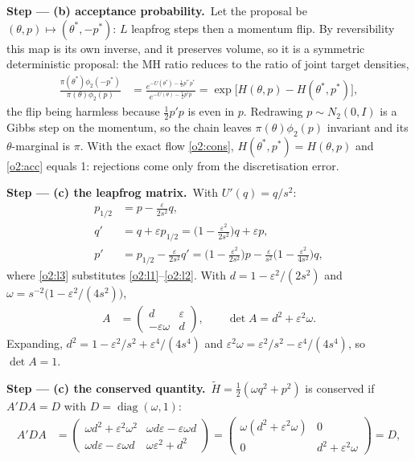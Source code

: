 \documentclass[11pt,a4paper]{article}
\newcommand{\passo}[2]{\par\smallskip\noindent\textbf{Step --- #1.}~#2}
\begin{document}
\begin{sol}
\passo{(b) acceptance probability}{Let the proposal be $(\theta,p)\mapsto(\theta^*,-p^*)$: $L$ leapfrog steps then a momentum flip. By reversibility this map is its own inverse, and it preserves volume, so it is a symmetric deterministic proposal: the MH ratio reduces to the ratio of joint target densities,
\begin{align}
\frac{\pi(\theta^*)\phi_2(-p^*)}{\pi(\theta)\phi_2(p)}&=\frac{e^{-U(\theta^*)-\frac12p^{*\prime}p^*}}{e^{-U(\theta)-\frac12p'p}}=\exp\big[H(\theta,p)-H(\theta^*,p^*)\big],\label{o2:acc}
\end{align}
the flip being harmless because $\frac12p'p$ is even in $p$. Redrawing $p\sim N_2(0,I)$ is a Gibbs step on the momentum, so the chain leaves $\pi(\theta)\phi_2(p)$ invariant and its $\theta$-marginal is $\pi$. With the exact flow \eqref{o2:cons}, $H(\theta^*,p^*)=H(\theta,p)$ and \eqref{o2:acc} equals 1: rejections come only from the discretisation error.}
\passo{(c) the leapfrog matrix}{With $U'(q)=q/s^2$:
\begin{align}
p_{1/2}&=p-\frac{\varepsilon}{2s^2}q,\label{o2:l1}\\
q'&=q+\varepsilon p_{1/2}=\Big(1-\frac{\varepsilon^2}{2s^2}\Big)q+\varepsilon p,\label{o2:l2}\\
p'&=p_{1/2}-\frac{\varepsilon}{2s^2}q'=\Big(1-\frac{\varepsilon^2}{2s^2}\Big)p-\frac{\varepsilon}{s^2}\Big(1-\frac{\varepsilon^2}{4s^2}\Big)q,\label{o2:l3}
\end{align}
where \eqref{o2:l3} substitutes \eqref{o2:l1}--\eqref{o2:l2}. With $d=1-\varepsilon^2/(2s^2)$ and $\omega=s^{-2}\big(1-\varepsilon^2/(4s^2)\big)$,
\begin{align}
A&=\begin{pmatrix}d&\varepsilon\\-\varepsilon\omega&d\end{pmatrix},\qquad\det A=d^2+\varepsilon^2\omega.\label{o2:A}
\end{align}
Expanding, $d^2=1-\varepsilon^2/s^2+\varepsilon^4/(4s^4)$ and $\varepsilon^2\omega=\varepsilon^2/s^2-\varepsilon^4/(4s^4)$, so $\det A=1$.}
\passo{(c) the conserved quantity}{$\tilde H=\frac12(\omega q^2+p^2)$ is conserved if $A'DA=D$ with $D=\operatorname{diag}(\omega,1)$:
\begin{align}
A'DA&=\begin{pmatrix}\omega d^2+\varepsilon^2\omega^2&\omega d\varepsilon-\varepsilon\omega d\\ \omega d\varepsilon-\varepsilon\omega d&\omega\varepsilon^2+d^2\end{pmatrix}=\begin{pmatrix}\omega(d^2+\varepsilon^2\omega)&0\\0&d^2+\varepsilon^2\omega\end{pmatrix}=D,\label{o2:shadow}

\end{align}}
\end{sol}
\end{document}
